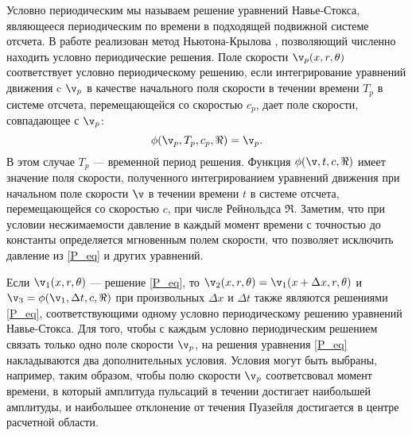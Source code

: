 Условно периодическим мы называем решение уравнений Навье-Стокса, являющееся периодическим по времени в подходящей подвижной системе отсчета. В работе реализован метод Ньютона-Крылова \cite{Sanchez2004}, позволяющий численно находить условно периодические решения. Поле скорости $\v_p(x,r,\theta)$ соответствует условно периодическому решению, если интегрирование уравнений движения c $\v_p$ в качестве начального поля скорости в течении времени $T_p$ в системе отсчета, перемещающейся со скоростью $c_p$, дает поле скорости, совпадающее с $\v_p$:
\begin{equation}\label{P_eq}
\phi(\v_p, T_p, c_p, \Re) = \v_p.
\end{equation}
В этом случае $T_p$  --- временной период решения. Функция $\phi(\v, t, c, \Re)$ имеет значение поля скорости, полученного интегрированием уравнений движения при начальном поле скорости $\v$ в течении времени $t$ в системе отсчета, перемещающейся со скоростью $c$, при числе Рейнольдса $\Re$. Заметим, что при условии несжимаемости давление в каждый момент времени с точностью до константы определяется мгновенным полем скорости, что позволяет исключить давление из \eqref{P_eq} и других уравнений. 

Если $\v_1(x,r,\theta)$ --- решение \eqref{P_eq}, то $\v_2(x, r, \theta) = \v_1(x + \Delta x, r, \theta)$ и $\v_3 = \phi(\v_1, \Delta t, c, \Re)$ при произвольных $\Delta x$ и $\Delta t$ также являются решениями \eqref{P_eq}, соответствующими одному условно периодическому решению уравнений Навье-Стокса. Для того, чтобы с каждым условно периодическим решением связать только одно поле скорости $\v_p$, на решения уравнения \eqref{P_eq} накладываются два дополнительных условия. Условия могут быть выбраны, например, таким образом, чтобы полю скорости $\v_p$ соответсвовал момент времени, в который амплитуда пульсаций в течении достигает наибольшей амплитуды, и наибольшее отклонение от течения Пуазейля достигается в центре расчетной области. 

